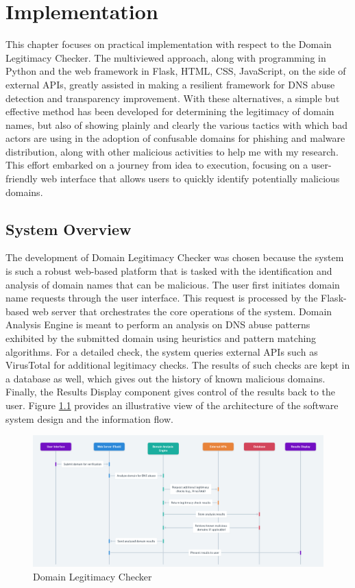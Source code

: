 \chapter{Implementation}



This chapter focuses on practical implementation with respect to the Domain Legitimacy Checker. The multiviewed approach, along with programming in Python and the web framework in Flask, HTML, CSS, JavaScript, on the side of external APIs, greatly assisted in making a resilient framework for DNS abuse detection and transparency improvement. With these alternatives, a simple but effective method has been developed for determining the legitimacy of domain names, but also of showing plainly and clearly the various tactics with which bad actors are using in the adoption of confusable domains for phishing and malware distribution, along with other malicious activities to help me with my research. This effort embarked on a journey from idea to execution, focusing on a user-friendly web interface that allows users to quickly identify potentially malicious domains. 

\section{System Overview}

The development of Domain Legitimacy Checker was chosen because the system is such a robust web-based platform that is tasked with the identification and analysis of domain names that can be malicious. The user first initiates domain name requests through the user interface. This request is processed by the Flask-based web server that orchestrates the core operations of the system. Domain Analysis Engine is meant to perform an analysis on DNS abuse patterns exhibited by the submitted domain using heuristics and pattern matching algorithms. For a detailed check, the system queries external APIs such as VirusTotal for additional legitimacy checks. The results of such checks are kept in a database as well, which gives out the history of known malicious domains. Finally, the Results Display component gives control of the results back to the user. Figure \ref{fig:figfig} provides an illustrative view of the architecture of the software system design and the information flow.


\begin{figure}[H]
\captionsetup{font= footnotesize}
    \centering
    \includegraphics[width=1\linewidth]{project/DNS Abuse Transparency System.png}
    \caption{Domain Legitimacy Checker}
    \label{fig:figfig}
\end{figure}

